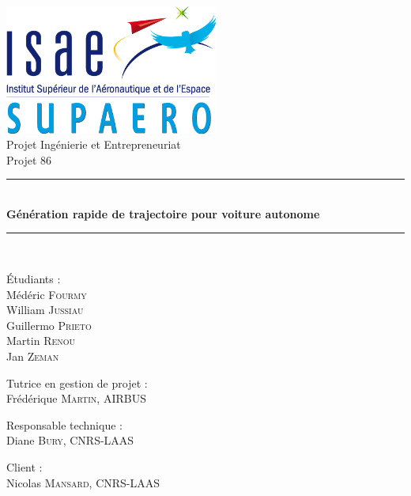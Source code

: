 \documentclass[a4paper,12pt]{report}
\begin{document}
\begin{titlepage}
\begin{center}
\includegraphics[width=7cm]{images/logo.png}\\[1cm]
{\Large Projet Ingénierie et Entrepreneuriat}\\[0.5cm]
{\Large Projet 86}\\[0.5cm]
\rule{\linewidth}{0.5mm} \\[0.4cm]
{ \huge \bfseries Génération rapide de trajectoire pour voiture autonome \\[0.4cm] }
\rule{\linewidth}{0.5mm} \\[1.5cm]
\noindent

\begin{center} \large
	Étudiants : \\
	\vspace*{0.3cm}
	Médéric \textsc{Fourmy}\\
	William \textsc{Jussiau}\\
        Guillermo \textsc{Prieto}\\
        Martin \textsc{Renou}\\
        Jan \textsc{Zeman}\\
\end{center}

\vspace*{1cm}

\begin{center} \large
	Tutrice en gestion de projet : \\
	Frédérique \textsc{Martin}, {AIRBUS} \\
	
		\vspace*{0.5cm}

	Responsable technique : \\
	Diane \textsc{Bury}, {CNRS-LAAS} \\
	
		\vspace*{0.5cm}

	Client : \\
	Nicolas \textsc{Mansard}, {CNRS-LAAS}
\end{center}

\vfill
\end{center}
\end{titlepage}
\end{document}
